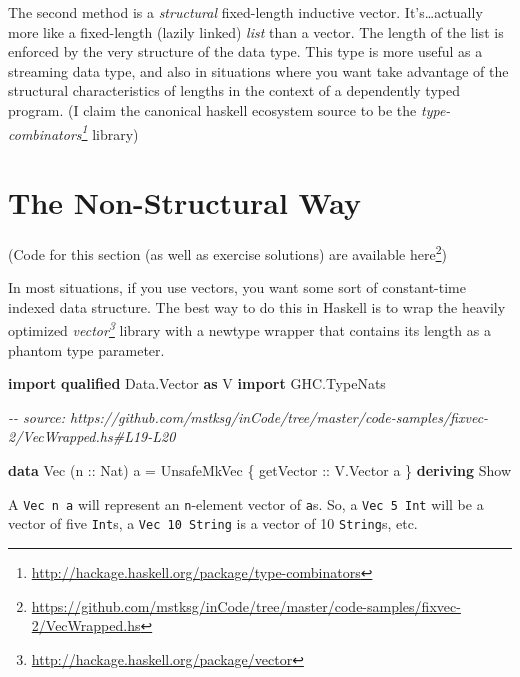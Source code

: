 \documentclass[]{article}
\newenvironment{Shaded}{}{}
\newcommand{\CommentTok}[1]{\textcolor[rgb]{0.38,0.63,0.69}{\textit{#1}}}
\newcommand{\DataTypeTok}[1]{\textcolor[rgb]{0.56,0.13,0.00}{#1}}
\newcommand{\KeywordTok}[1]{\textcolor[rgb]{0.00,0.44,0.13}{\textbf{#1}}}
\newcommand{\NormalTok}[1]{#1}
\newcommand{\OtherTok}[1]{\textcolor[rgb]{0.00,0.44,0.13}{#1}}
\renewcommand{\href}[2]{#2\footnote{\url{#1}}}
\begin{document}
The second method is a \emph{structural} fixed-length inductive vector.
It's\ldots actually more like a fixed-length (lazily linked) \emph{list} than a
vector. The length of the list is enforced by the very structure of the data
type. This type is more useful as a streaming data type, and also in situations
where you want take advantage of the structural characteristics of lengths in
the context of a dependently typed program. (I claim the canonical haskell
ecosystem source to be the
\emph{\href{http://hackage.haskell.org/package/type-combinators}{type-combinators}}
library)

\hypertarget{the-non-structural-way}{%
\section{The Non-Structural Way}\label{the-non-structural-way}}

(Code for this section (as well as exercise solutions) are
\href{https://github.com/mstksg/inCode/tree/master/code-samples/fixvec-2/VecWrapped.hs}{available
here})

In most situations, if you use vectors, you want some sort of constant-time
indexed data structure. The best way to do this in Haskell is to wrap the
heavily optimized
\emph{\href{http://hackage.haskell.org/package/vector}{vector}} library with a
newtype wrapper that contains its length as a phantom type parameter.

\begin{Shaded}
\begin{Highlighting}[]
\KeywordTok{import} \KeywordTok{qualified} \DataTypeTok{Data.Vector} \KeywordTok{as} \DataTypeTok{V}
\KeywordTok{import}           \DataTypeTok{GHC.TypeNats}

\CommentTok{{-}{-} source: https://github.com/mstksg/inCode/tree/master/code{-}samples/fixvec{-}2/VecWrapped.hs\#L19{-}L20}

\KeywordTok{data} \DataTypeTok{Vec}\NormalTok{ (}\OtherTok{n ::} \DataTypeTok{Nat}\NormalTok{) a }\OtherTok{=} \DataTypeTok{UnsafeMkVec}\NormalTok{ \{}\OtherTok{ getVector ::} \DataTypeTok{V.Vector}\NormalTok{ a \}}
    \KeywordTok{deriving} \DataTypeTok{Show}
\end{Highlighting}
\end{Shaded}

A \texttt{Vec\ n\ a} will represent an \texttt{n}-element vector of \texttt{a}s.
So, a \texttt{Vec\ 5\ Int} will be a vector of five \texttt{Int}s, a
\texttt{Vec\ 10\ String} is a vector of 10 \texttt{String}s, etc.
\end{document}
